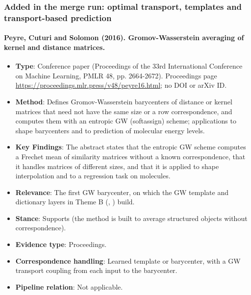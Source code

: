 \documentclass[journal,onecolumn]{IEEEtran}
\begin{document}
\subsubsection{Added in the merge run: optimal transport, templates and transport-based prediction}

\paragraph{Peyre, Cuturi and Solomon (2016). Gromov-Wasserstein averaging of kernel and distance matrices.~\cite{Peyre2016Gromov}}\mbox{}

\begin{itemize}

\item{} \textbf{Type}: Conference paper (Proceedings of the 33rd International Conference on Machine Learning, PMLR 48, pp. 2664-2672). Proceedings page \url{https://proceedings.mlr.press/v48/peyre16.html}; no DOI or arXiv ID.

\item{} \textbf{Method}: Defines Gromov-Wasserstein barycenters of distance or kernel matrices that need not have the same size or a row correspondence, and computes them with an entropic GW (softassign) scheme; applications to shape barycenters and to prediction of molecular energy levels.

\item{} \textbf{Key Findings}: The abstract states that the entropic GW scheme computes a Frechet mean of similarity matrices without a known correspondence, that it handles matrices of different sizes, and that it is applied to shape interpolation and to a regression task on molecules.

\item{} \textbf{Relevance}: The first GW barycenter, on which the GW template and dictionary layers in Theme B (\cite{VincentCuaz2021Online}, \cite{VincentCuaz2022Template}) build.

\item{} \textbf{Stance}: Supports (the method is built to average structured objects without correspondence).

\item{} \textbf{Evidence type}: Proceedings.

\item{} \textbf{Correspondence handling}: Learned template or barycenter, with a GW transport coupling from each input to the barycenter.

\item{} \textbf{Pipeline relation}: Not applicable.


\end{itemize}
\end{document}
